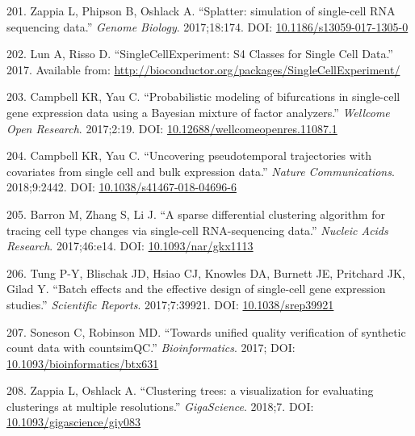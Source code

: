 \documentclass[11pt,a4paper,titlepage,twoside,openright]{style/unimelbthesis}
\theoremstyle{definition}
\theoremstyle{definition}
\theoremstyle{definition}
\theoremstyle{remark}
\begin{document}
\begin{mainmatter}
\leavevmode\hypertarget{ref-Zappia2017-sg}{}%
201. Zappia L, Phipson B, Oshlack A. ``Splatter: simulation of single-cell RNA sequencing data.'' \emph{Genome Biology}. 2017;18:174. DOI: \href{https://doi.org/10.1186/s13059-017-1305-0}{10.1186/s13059-017-1305-0}

\leavevmode\hypertarget{ref-Lun2017-jj}{}%
202. Lun A, Risso D. ``SingleCellExperiment: S4 Classes for Single Cell Data.'' 2017. Available from: \url{http://bioconductor.org/packages/SingleCellExperiment/}

\leavevmode\hypertarget{ref-Campbell2017-yh}{}%
203. Campbell KR, Yau C. ``Probabilistic modeling of bifurcations in single-cell gene expression data using a Bayesian mixture of factor analyzers.'' \emph{Wellcome Open Research}. 2017;2:19. DOI: \href{https://doi.org/10.12688/wellcomeopenres.11087.1}{10.12688/wellcomeopenres.11087.1}

\leavevmode\hypertarget{ref-Campbell2018-dz}{}%
204. Campbell KR, Yau C. ``Uncovering pseudotemporal trajectories with covariates from single cell and bulk expression data.'' \emph{Nature Communications}. 2018;9:2442. DOI: \href{https://doi.org/10.1038/s41467-018-04696-6}{10.1038/s41467-018-04696-6}

\leavevmode\hypertarget{ref-Barron2017-nd}{}%
205. Barron M, Zhang S, Li J. ``A sparse differential clustering algorithm for tracing cell type changes via single-cell RNA-sequencing data.'' \emph{Nucleic Acids Research}. 2017;46:e14. DOI: \href{https://doi.org/10.1093/nar/gkx1113}{10.1093/nar/gkx1113}

\leavevmode\hypertarget{ref-Tung2017-ry}{}%
206. Tung P-Y, Blischak JD, Hsiao CJ, Knowles DA, Burnett JE, Pritchard JK, Gilad Y. ``Batch effects and the effective design of single-cell gene expression studies.'' \emph{Scientific Reports}. 2017;7:39921. DOI: \href{https://doi.org/10.1038/srep39921}{10.1038/srep39921}

\leavevmode\hypertarget{ref-Soneson2017-yt}{}%
207. Soneson C, Robinson MD. ``Towards unified quality verification of synthetic count data with countsimQC.'' \emph{Bioinformatics}. 2017; DOI: \href{https://doi.org/10.1093/bioinformatics/btx631}{10.1093/bioinformatics/btx631}

\leavevmode\hypertarget{ref-Zappia2018-lz}{}%
208. Zappia L, Oshlack A. ``Clustering trees: a visualization for evaluating clusterings at multiple resolutions.'' \emph{GigaScience}. 2018;7. DOI: \href{https://doi.org/10.1093/gigascience/giy083}{10.1093/gigascience/giy083}


\end{mainmatter}
\end{document}
